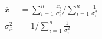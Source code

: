 

\vspace*{\fill}
\centering

\begin{align*}
    \overline{x} &= \sum_{i=1}^{n} \frac{x_{i}}{\sigma_{i}^2} \Big/ \sum_{i=1}^{n} \frac{1}{\sigma_{i}^2} \\
    \sigma_{\overline{x}}^2 &= 1 / \sum_{i=1}^{n} \frac{1}{\sigma_{i}^2}
\end{align*}

\centering
\vspace*{\fill}

